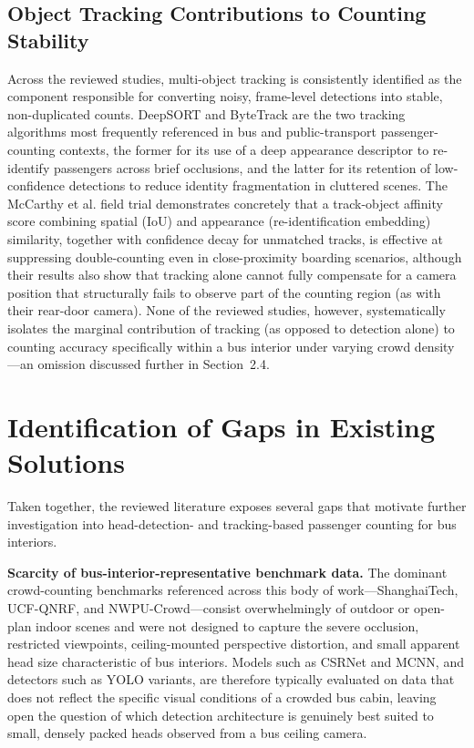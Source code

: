 \documentclass[12pt,a4paper]{report}
\begin{document}
\subsection{Object Tracking Contributions to Counting Stability}

Across the reviewed studies, multi-object tracking is consistently identified as the component responsible for converting noisy, frame-level detections into stable, non-duplicated counts. DeepSORT and ByteTrack are the two tracking algorithms most frequently referenced in bus and public-transport passenger-counting contexts, the former for its use of a deep appearance descriptor to re-identify passengers across brief occlusions, and the latter for its retention of low-confidence detections to reduce identity fragmentation in cluttered scenes. The McCarthy et al. field trial demonstrates concretely that a track-object affinity score combining spatial (IoU) and appearance (re-identification embedding) similarity, together with confidence decay for unmatched tracks, is effective at suppressing double-counting even in close-proximity boarding scenarios, although their results also show that tracking alone cannot fully compensate for a camera position that structurally fails to observe part of the counting region (as with their rear-door camera). None of the reviewed studies, however, systematically isolates the marginal contribution of tracking (as opposed to detection alone) to counting accuracy specifically within a bus interior under varying crowd density---an omission discussed further in Section~2.4.

\section{Identification of Gaps in Existing Solutions}

Taken together, the reviewed literature exposes several gaps that motivate further investigation into head-detection- and tracking-based passenger counting for bus interiors.

\textbf{Scarcity of bus-interior-representative benchmark data.}
The dominant crowd-counting benchmarks referenced across this body of work---ShanghaiTech, UCF-QNRF, and NWPU-Crowd---consist overwhelmingly of outdoor or open-plan indoor scenes and were not designed to capture the severe occlusion, restricted viewpoints, ceiling-mounted perspective distortion, and small apparent head size characteristic of bus interiors. Models such as CSRNet and MCNN, and detectors such as YOLO variants, are therefore typically evaluated on data that does not reflect the specific visual conditions of a crowded bus cabin, leaving open the question of which detection architecture is genuinely best suited to small, densely packed heads observed from a bus ceiling camera.
\end{document}
